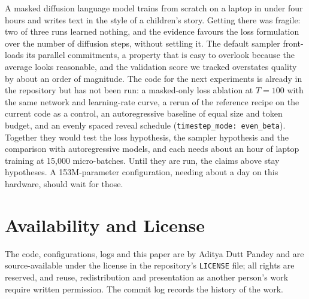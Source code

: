 \documentclass[conference]{IEEEtran}
\begin{document}
A masked diffusion language model trains from scratch on a laptop in under four
hours and writes text in the style of a children's story. Getting there was
fragile: two of three runs learned nothing, and the evidence favours the loss
formulation over the number of diffusion steps, without settling it. The
default sampler front-loads its parallel commitments, a property that is easy to
overlook because the average looks reasonable, and the validation score we
tracked overstates quality by about an order of magnitude. The code for the next
experiments is already in the repository but has not been run: a masked-only
loss ablation at $T{=}100$ with the same network and learning-rate curve, a
rerun of the reference recipe on the current code as a control, an
autoregressive baseline of equal size and token budget, and an evenly spaced
reveal schedule (\texttt{timestep\_mode: even\_beta}). Together they would test
the loss hypothesis, the sampler hypothesis and the comparison with
autoregressive models, and each needs about an hour of laptop training at
15,000 micro-batches. Until they are run, the claims above stay hypotheses. A
153M-parameter configuration, needing about a day on this hardware, should
wait for those.

\section*{Availability and License}

The code, configurations, logs and this paper are by Aditya Dutt Pandey and are
source-available under the license in the repository's \texttt{LICENSE} file;
all rights are reserved, and reuse, redistribution and presentation as another
person's work require written permission. The commit log records the history of
the work.



\end{document}
